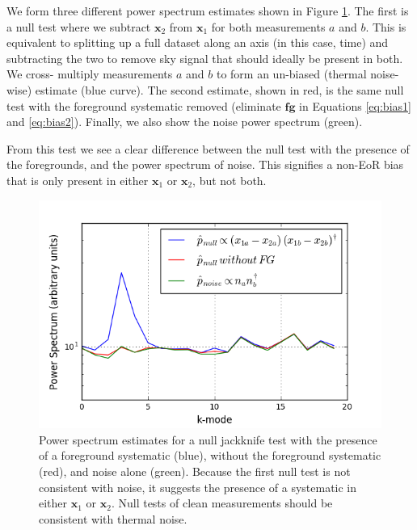 \documentclass[preprint2,numberedappendix,tighten]{aastex6}  %
\begin{document}
We form three different power spectrum estimates shown in Figure \ref{fig:toy_bias1}. The first is a null test where we subtract $
\textbf{x}_{2}$ from $\textbf{x}_{1}$ for both measurements $a$ and $b$. This is equivalent to splitting up a full dataset along 
an axis (in this case, time) and subtracting the two to remove sky signal that should ideally be present in both. We cross-
multiply measurements $a$ and $b$ to form an un-biased (thermal noise-wise) estimate (blue curve). The second estimate, 
shown in red, is the same null test with the foreground systematic removed (eliminate $\textbf{fg}$ in Equations \ref{eq:bias1} 
and \ref{eq:bias2}). Finally, we also show the noise power spectrum (green).

From this test we see a clear difference between the null test with the presence of the foregrounds, and the power spectrum of 
noise. This signifies a non-EoR bias that is only present in either $\textbf{x}_{1}$ or $\textbf{x}_{2}$, but not both.

\begin{figure}
	\centering
	\includegraphics[trim={0.3cm 0cm 0.3cm 0.3cm},width=\columnwidth]{plots/toy_bias1.png}
	\caption{Power spectrum estimates for a null jackknife test with the presence of a foreground systematic (blue), without 
the foreground systematic (red), and noise alone (green). Because the first null test is not consistent with noise, it suggests the 
presence of a systematic in either $\textbf{x}_{1}$ or $\textbf{x}_{2}$. Null tests of clean measurements should be consistent 
with thermal noise.}
	\label{fig:toy_bias1}
\end{figure}
\end{document}
